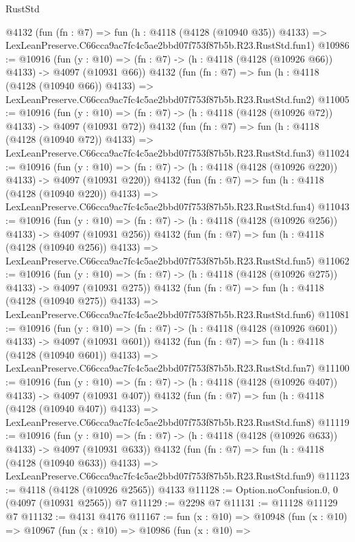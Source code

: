 \begin{lexlean}{RustStd}
\begin{coremodule}
    @4132
    (fun (fn : @7) =>
    fun (h : @4118 (@4128 (@10940 @35)) @4133) =>
    LexLeanPreserve.C66cca9ac7fc4c5ae2bbd07f753f87b5b.R23.RustStd.fun1)
@10986 := @10916
    (fun (y : @10) => (fn : @7) -> (h : @4118 (@4128 (@10926 @66)) @4133) -> @4097 (@10931 @66))
    @4132
    (fun (fn : @7) =>
    fun (h : @4118 (@4128 (@10940 @66)) @4133) =>
    LexLeanPreserve.C66cca9ac7fc4c5ae2bbd07f753f87b5b.R23.RustStd.fun2)
@11005 := @10916
    (fun (y : @10) => (fn : @7) -> (h : @4118 (@4128 (@10926 @72)) @4133) -> @4097 (@10931 @72))
    @4132
    (fun (fn : @7) =>
    fun (h : @4118 (@4128 (@10940 @72)) @4133) =>
    LexLeanPreserve.C66cca9ac7fc4c5ae2bbd07f753f87b5b.R23.RustStd.fun3)
@11024 := @10916
    (fun (y : @10) => (fn : @7) -> (h : @4118 (@4128 (@10926 @220)) @4133) -> @4097 (@10931 @220))
    @4132
    (fun (fn : @7) =>
    fun (h : @4118 (@4128 (@10940 @220)) @4133) =>
    LexLeanPreserve.C66cca9ac7fc4c5ae2bbd07f753f87b5b.R23.RustStd.fun4)
@11043 := @10916
    (fun (y : @10) => (fn : @7) -> (h : @4118 (@4128 (@10926 @256)) @4133) -> @4097 (@10931 @256))
    @4132
    (fun (fn : @7) =>
    fun (h : @4118 (@4128 (@10940 @256)) @4133) =>
    LexLeanPreserve.C66cca9ac7fc4c5ae2bbd07f753f87b5b.R23.RustStd.fun5)
@11062 := @10916
    (fun (y : @10) => (fn : @7) -> (h : @4118 (@4128 (@10926 @275)) @4133) -> @4097 (@10931 @275))
    @4132
    (fun (fn : @7) =>
    fun (h : @4118 (@4128 (@10940 @275)) @4133) =>
    LexLeanPreserve.C66cca9ac7fc4c5ae2bbd07f753f87b5b.R23.RustStd.fun6)
@11081 := @10916
    (fun (y : @10) => (fn : @7) -> (h : @4118 (@4128 (@10926 @601)) @4133) -> @4097 (@10931 @601))
    @4132
    (fun (fn : @7) =>
    fun (h : @4118 (@4128 (@10940 @601)) @4133) =>
    LexLeanPreserve.C66cca9ac7fc4c5ae2bbd07f753f87b5b.R23.RustStd.fun7)
@11100 := @10916
    (fun (y : @10) => (fn : @7) -> (h : @4118 (@4128 (@10926 @407)) @4133) -> @4097 (@10931 @407))
    @4132
    (fun (fn : @7) =>
    fun (h : @4118 (@4128 (@10940 @407)) @4133) =>
    LexLeanPreserve.C66cca9ac7fc4c5ae2bbd07f753f87b5b.R23.RustStd.fun8)
@11119 := @10916
    (fun (y : @10) => (fn : @7) -> (h : @4118 (@4128 (@10926 @633)) @4133) -> @4097 (@10931 @633))
    @4132
    (fun (fn : @7) =>
    fun (h : @4118 (@4128 (@10940 @633)) @4133) =>
    LexLeanPreserve.C66cca9ac7fc4c5ae2bbd07f753f87b5b.R23.RustStd.fun9)
@11123 := @4118 (@4128 (@10926 @2565)) @4133
@11128 := Option.noConfusion.{0, 0} (@4097 (@10931 @2565)) @7
@11129 := @2298 @7
@11131 := @11128 @11129 @7
@11132 := @4131 @4176
@11167 := fun (x : @10) =>
  @10948
    (fun (x : @10) =>
    @10967
      (fun (x : @10) =>
      @10986
        (fun (x : @10) =>

\end{coremodule}
\end{lexlean}
